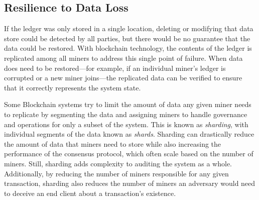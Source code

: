 \subsection{Resilience to Data Loss}

If the ledger was only stored in a single location, deleting or modifying that data store could be detected by all parties, but there would be no guarantee that the data could be restored.
With blockchain technology, the contents of the ledger is replicated among all miners to address this single point of failure. When data does need to be restored---for example, if an individual miner's ledger is corrupted or a new miner joins---the replicated data can be verified to ensure that it correctly represents the system state.



Some Blockchain systems try to limit the amount of data any given miner needs to replicate by segmenting the data and assigning miners to handle governance and operations for only a subset of the system.
This is known as \emph{sharding}, with individual segments of the data known as \emph{shards}.
Sharding can drastically reduce the amount of data that miners need to store while also increasing the performance of the consensus protocol, which often scale based on the number of miners.
Still, sharding adds complexity to auditing the system as a whole.
Additionally, by reducing the number of miners responsible for any given transaction, sharding also reduces the number of miners an adversary would need to deceive an end client about a transaction's existence.


